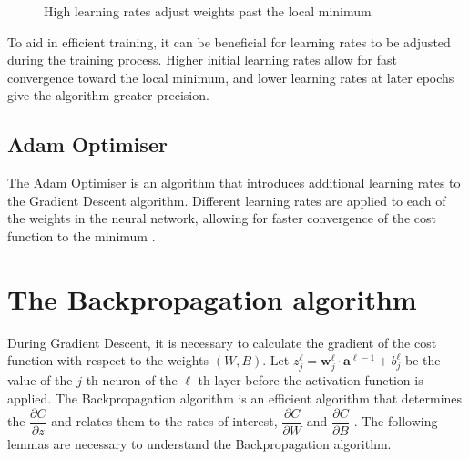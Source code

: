 \begin{figure}[ht]

\caption{\small{High learning rates adjust weights past the local minimum}}
\label{nnets-high-learn-fig}
\end{figure}

To aid in efficient training, it can be beneficial for learning rates to be adjusted during the training process. Higher initial learning rates allow for fast convergence toward the local minimum, and lower learning rates at later epochs give the algorithm greater precision.

\subsection*{Adam Optimiser}\label{nnets-adam}

The Adam Optimiser is an algorithm that introduces additional learning rates to the Gradient Descent algorithm. Different learning rates are applied to each of the weights in the neural network, allowing for faster convergence of the cost function to the minimum \citep{Kingma2014}.


\section{The Backpropagation algorithm}\label{nnets-backprop}

During Gradient Descent, it is necessary to calculate the gradient of the cost function with respect to the weights $(W,B)$. Let $z_j^\ell = \mathbf{w}_j^\ell \cdot \mathbf{a}^{\ell - 1} + b_j^\ell$ be the value of the $j$-th neuron of the $\ell$-th layer before the activation function is applied. The Backpropagation algorithm is an efficient algorithm that determines the $\dfrac{\partial C}{\partial z}$ and relates them to the rates of interest, $\dfrac{\partial C}{\partial W}$ and $\dfrac{\partial C}{\partial B}$ \citep{Nielson2015}. The following lemmas are necessary to understand the Backpropagation algorithm.


